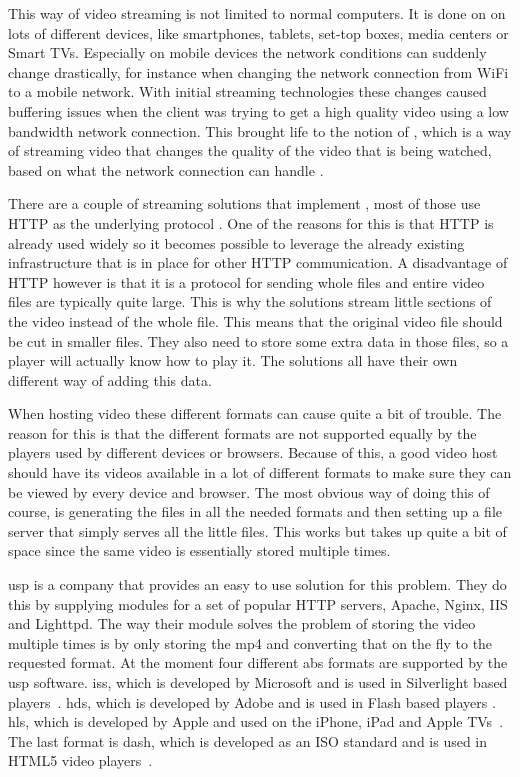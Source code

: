 \documentclass[twoside,openright]{uva-bachelor-thesis}
\begin{document}
This way of video streaming is not limited to normal computers. It is done on on
lots of different devices, like smartphones, tablets, set-top boxes,
media centers or Smart TVs. Especially on mobile devices the network conditions
can suddenly change drastically, for instance when changing the network
connection from WiFi to a mobile network. With initial streaming technologies
these changes caused buffering issues when the client was trying to get a high
quality video using a low bandwidth network connection. This brought life to the
notion of \abs, which is a way of streaming video that changes the quality
of the video that is being watched, based on what the network connection can
handle \autocite{abs}.

There are a couple of streaming solutions that implement \abs, most of
those use HTTP as the underlying protocol \autocite{http}.  One of the reasons
for this is that HTTP is already used widely so it becomes possible to
leverage the already existing infrastructure that is in place for other HTTP
communication. A disadvantage of HTTP however is that it is a protocol for
sending whole files and entire video files are typically quite large. This is
why the solutions stream little sections of the video instead of the whole file.
This means that the original video file should be cut in smaller files. They
also need to store some extra data in those files, so a player will actually
know how to play it. The solutions all have their own different way of adding
this data.

When hosting video these different formats can cause quite a bit of trouble.
The reason for this is that the different formats are not supported equally by
the players used by different devices or browsers. Because of this, a good video
host should have its videos available in a lot of different formats to make sure
they can be viewed by every device and browser. The most obvious way of doing
this of course, is generating the files in all the needed formats and then
setting up a file server that simply serves all the little files. This works but
takes up quite a bit of space since the same video is essentially stored
multiple times.

\Gls{usp} is a company that provides an easy to use solution for this problem.
They do this by supplying modules for a set of popular HTTP servers, Apache,
Nginx, IIS and Lighttpd. The way their module solves the problem of storing the
video multiple times is by only storing the mp4 and converting that on the fly
to the requested format. At the moment four different \gls{abs} formats are
supported by the \gls{usp} software. \Gls{iss}, which is developed by Microsoft and is
used in Silverlight based players~\autocite{iss}. \Gls{hds}, which is developed by
Adobe and is used in Flash based players \autocite{hds}.  \Gls{hls}, which is developed
by Apple and used on the iPhone, iPad and Apple TVs~\autocite{hls}. The last
format is \gls{dash}, which is developed as an ISO standard and is used in
\textsc{HTML5} video players~\autocite{dash}.
\end{document}
